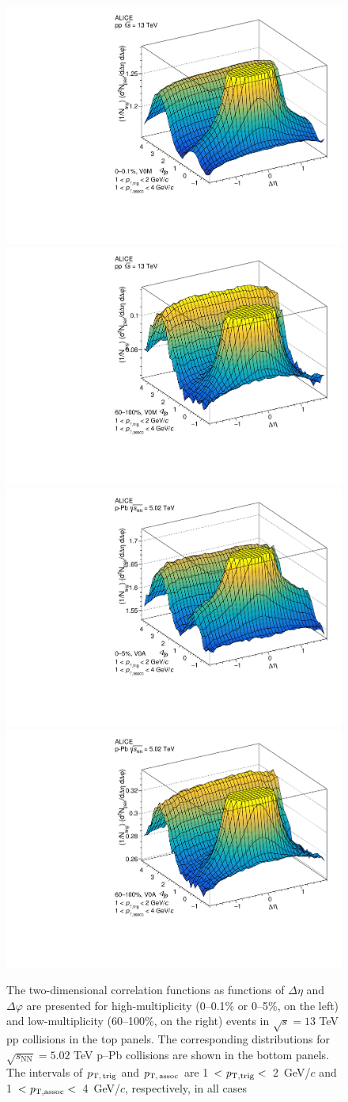 \begin{figure}[h!]
		\includegraphics[width=0.5 \textwidth]{figures/Fig1_ppHigh.pdf} 
		\includegraphics[width=0.5 \textwidth]{figures/Fig1_ppLow.pdf} 
  		\includegraphics[width=0.5 \textwidth]{figures/Fig1_pPbHigh.pdf}
		\includegraphics[width=0.5 \textwidth]{figures/Fig1_pPbLow.pdf}
\caption{The two-dimensional correlation functions as functions of $\Delta\eta$ and $\Delta\varphi$ are presented for high-multiplicity (0--0.1\% or 0--5\%, on the left) and low-multiplicity (60--100\%, on the right) events in $\sqrt{s}=13$ TeV pp collisions in the top panels. The corresponding distributions for $\sqrt{s_{\mathrm{NN}}}=5.02$ TeV p--Pb collisions are shown in the bottom panels. The intervals of $p_\mathrm{T,\,trig}$ and $p_\mathrm{T,\,assoc}$ are 1~$<\it{p}_{\rm{T,trig}}<$~2~GeV/$c$ and 1~$<\it{p}_{\rm{T,assoc}}<$~4~GeV/$c$, respectively, in all cases}
\label{fig:doubleridge}
\end{figure}

